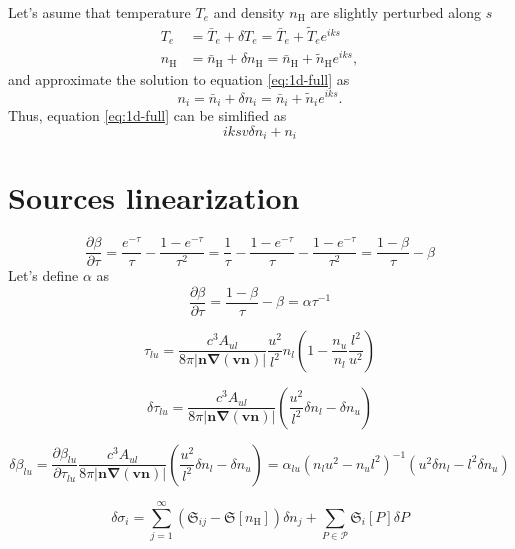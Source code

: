 \documentclass{article}
\begin{document}
Let's asume that temperature \(T_e\) and density \(n_\mathrm{H}\) are slightly perturbed along \(s\)
\begin{equation}
\begin{aligned}
    T_e &= \bar{T}_e + \delta T_e = \bar{T}_e + \tilde{T}_e e^{iks}\\
    n_\mathrm{H} &= \bar{n}_\mathrm{H} + \delta n_\mathrm{H} = \bar{n}_\mathrm{H} + \tilde{n}_\mathrm{H} e^{iks},
\end{aligned}
\end{equation}
and approximate the solution to equation \eqref{eq:1d-full} as
\begin{equation}
n_i = \bar{n}_i + \delta n_i = \bar{n}_i + \tilde{n}_i e^{iks}.
\end{equation}
Thus, equation \eqref{eq:1d-full} can be simlified as
\begin{equation}
    iksv\delta n_i + n_i
\end{equation}

\section{Sources linearization}

\[
\frac{\partial \beta}{\partial \tau} = \frac{e^{-\tau}}{\tau} - \frac{1-e^{-\tau}}{\tau^2} = \frac{1}{\tau} - \frac{1 - e^{-\tau}}{\tau}  - \frac{1 - e^{-\tau}}{\tau^2} = \frac{1-\beta}{\tau} - \beta
\]
Let's define \(\alpha\) as
\[
\frac{\partial \beta}{\partial \tau} = \frac{1-\beta}{\tau} - \beta = \alpha \tau^{-1}
\]

\[
    \tau_{lu} = \frac{c^3A_{ul}}{8\pi |\mathbf{n}\mathbf{\nabla}(\mathbf{v}\mathbf{n})|}\frac{u^2}{l^2} n_l \left(1 - \frac{n_u}{n_l}\frac{l^2}{u^2}\right)
\]

\[
    \delta\tau_{lu} =  \frac{c^3A_{ul}}{8\pi |\mathbf{n}\mathbf{\nabla}(\mathbf{v}\mathbf{n})|}\left( \frac{u^2}{l^2}\delta n_l - \delta n_u \right)
\]

\[
    \delta\beta_{lu} = \frac{\partial \beta_{lu}}{\partial \tau_{lu}} \frac{c^3A_{ul}}{8\pi |\mathbf{n}\mathbf{\nabla}(\mathbf{v}\mathbf{n})|}\left( \frac{u^2}{l^2}\delta n_l - \delta n_u \right) = \alpha_{lu}(n_lu^2 - n_ul^2)^{-1}(u^2\delta n_l - l^2 \delta n_u)
\]


\[
    \delta\sigma_i = \sum\limits_{j = 1}^\infty  \left(\mathfrak{S}_{ij}-\mathfrak{S}[n_\mathrm{H}]\right)\delta n_j + \sum\limits_{P \in \mathcal{P}}\mathfrak{S}_i[P]\delta{P}
\]
\end{document}
